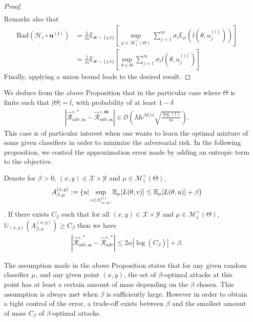 \begin{proof}
\begin{align*}
\end{align*}
Remarks also that 
\begin{align*}
    \text{Rad}(\mathcal{H}_i\circ \mathbf{u^{(i)}})&=\frac{1}{m}\mathbb{E}_{\bm{\sigma}\sim\{\pm 1\}}\left[\sup_{\mu\in\mathcal{M}_1^{+}(\Theta)}\sum_{j=1}^m\sigma_i\mathbb{E}_{\mu}(l(\theta,u^{(i)}_j))\right]\\
    &=\frac{1}{m}\mathbb{E}_{\bm{\sigma}\sim\{\pm 1\}}\left[\sup_{\theta\in\Theta}\sum_{j=1}^m\sigma_i l(\theta,u^{(i)}_j)\right]
\end{align*}
Finally, applying a union bound leads to the desired result.

\end{proof}




We deduce from the above Proposition that in the particular case where $\Theta$ is finite such that $|\Theta|= l$, with probability of at least $1-\delta$
\begin{align*}
   |\widehat{\mathcal{R}}_{adv,\bm{\alpha}}^{\varepsilon,*} - \widehat{\mathcal{R}}_{adv,\bm{\alpha}}^{\varepsilon,\bm{m}}| \in \mathcal{O}\left(Me^{M/\alpha}\sqrt{\frac{\log(l)}{m}} \right).
\end{align*}
This case is of particular interest when one wants to learn the optimal mixture of some given classifiers in order to minimize the adversarial risk. In the following proposition, we control the approximation error made by adding an entropic term to the objective. %
\begin{prop}
\label{prop:control-error-approx}
Denote for $\beta>0$, $(x,y)\in\mathcal{X}\times\mathcal{Y}$ and $\mu\in\mathcal{M}_{1}^{+}(\Theta)$,
    $$A_{\beta,\mu}^{\left(  x,y\right)}:=\{u|\sup_{v\in  S_{(x,y)}^{(\varepsilon)}}\mathbb{E}_{\mu}[\loss(\theta,v)]\leq \mathbb{E}_{\mu}[\loss(\theta,u)]+\beta\}$$. 
    If there exists $C_{\beta}$ such that for all $(x,y)\in\mathcal{X}\times\mathcal{Y}$ and $\mu\in\mathcal{M}_{1}^{+}(\Theta)$, $\mathbb{U}_{(x,y)}\left(A_{\beta,\mu}^{\left(  x,y\right)}\right)\geq C_\beta$ then we have
\begin{align*}
   |\widehat{\mathcal{R}}_{adv,\bm{\alpha}}^{\varepsilon,*} - \widehat{\mathcal{R}}_{adv}^{\varepsilon,*}|\leq 2\alpha |\log(C_\beta)| + \beta.
\end{align*}
\end{prop}




The assumption made in the above Proposition states that for any given random classifier $\mu$, and any given point $(x,y)$, the set of $\beta$-optimal attacks at this point has at least a certain amount of mass depending on the $\beta$ chosen. This assumption is always met when $\beta$ is sufficiently large. However in order to obtain a tight control of the error, a trade-off exists between $\beta$ and the smallest amount of mass $C_{\beta}$ of $\beta$-optimal attacks.

